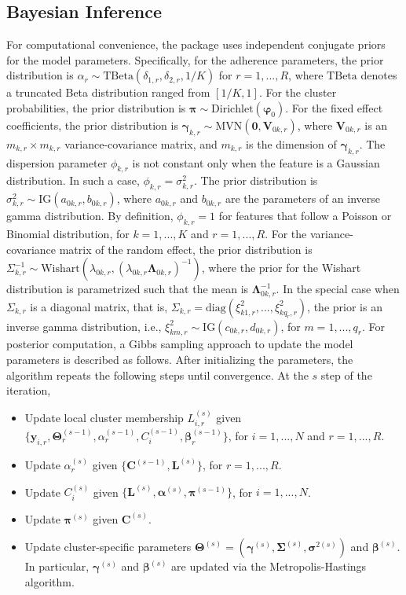 \subsection{Bayesian Inference}
For computational convenience, the  package uses independent conjugate priors for the model parameters. Specifically, for the adherence parameters, the prior distribution is $\alpha_r \sim \text{TBeta}(\delta_{1,r}, \delta_{2,r}, 1/K)$ for $r = 1,...,R$, where $\text{TBeta}$ denotes a truncated Beta distribution ranged from $[1/K, 1]$. For the cluster probabilities, the prior distribution is $\boldsymbol{\pi}\sim \text{Dirichlet}(\boldsymbol{\varphi}_0)$. For the fixed effect coefficients, the prior distribution is $\boldsymbol{\gamma}_{k,r} \sim \text{MVN}(\boldsymbol{0},\boldsymbol{V}_{0k,r})$, where $\boldsymbol{V}_{0k,r}$ is an $m_{k,r} \times m_{k,r}$ variance-covariance matrix, and $m_{k,r}$ is the dimension of $\boldsymbol{\gamma}_{k,r}$. The dispersion parameter $\phi_{k,r}$ is not constant only when the feature is a Gaussian distribution. In such a case, $\phi_{k,r} = \sigma^2_{k,r}$. The prior distribution is $\sigma^2_{k,r} \sim \text{IG}(a_{0k,r},b_{0k,r}) $, where $a_{0k,r}$ and $b_{0k,r}$ are the parameters of an inverse gamma distribution. By definition, $\phi_{k,r} = 1$ for features that follow a Poisson or Binomial distribution, for $k=1,...,K$ and $r=1,...,R$. For the variance-covariance matrix of the random effect, the prior distribution is $\Sigma_{k,r}^{-1} \sim \text{Wishart}(\lambda_{0k,r}, (\lambda_{0k,r}\boldsymbol{\Lambda}_{0k,r})^{-1} )$, where the prior for the Wishart distribution is parametrized such that the mean is $\boldsymbol{\Lambda}_{0k,r}^{-1}$. In the special case when $\Sigma_{k,r}$ is a diagonal matrix, that is, $\Sigma_{k,r} = \text{diag}(\xi^2_{k1,r},...,\xi^2_{kq_r,r})$, the prior is an inverse gamma distribution, i.e., $\xi^2_{km,r} \sim \text{IG}(c_{0k,r},d_{0k,r})$, for $m = 1,..., q_r$. 
For posterior computation, a Gibbs sampling approach to update the model parameters is described as follows. After initializing the parameters, the algorithm repeats the following steps until convergence. At the $s$ step of the iteration, 
 \begin{itemize}
	\item Update local cluster membership $ L_{i,r}^{(s)}$ given $\{\boldsymbol{y}_{i,r}, \boldsymbol{\Theta}_r^{(s-1)}, \alpha_r^{(s-1)}, C_i^{(s-1)}, \boldsymbol{\beta}_r^{(s-1)} \}$, for $i=1,...,N$ and  $r=1,...,R$.
	\item Update $\alpha_r^{(s)}$ given $\{ \boldsymbol{C}^{(s-1)}, \boldsymbol{L}^{(s)} \}$, for $r=1,...,R$.
	\item Update $ C_i^{(s)}$ given $\{ \boldsymbol{L}^{(s)},  \boldsymbol{\alpha}^{(s)}, \boldsymbol{\pi}^{(s-1)}\}$, for $i=1,...,N$.
	\item Update $\boldsymbol{\pi}^{(s)}$ given $ \boldsymbol{C}^{(s)}$.
	\item Update cluster-specific parameters $\boldsymbol{\Theta}^{(s)} = (\boldsymbol{\gamma}^{(s)},\boldsymbol{\Sigma}^{(s)}, \boldsymbol{\sigma}^{2(s)})$ and  $\boldsymbol{\beta}^{(s)}$. In particular, $\boldsymbol{\gamma}^{(s)}$ and $\boldsymbol{\beta}^{(s)}$ are updated via the Metropolis-Hastings algorithm.
\end{itemize}
